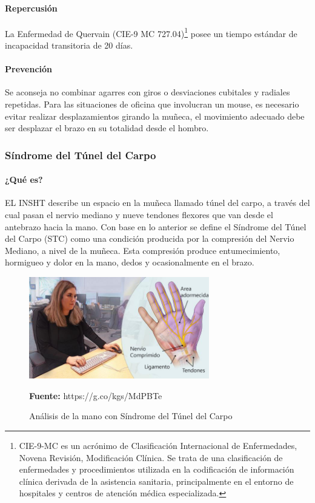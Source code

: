 \paragraph{Repercusión}
La Enfermedad de Quervain (CIE-9 MC 727.04)\footnote{CIE-9-MC es un acrónimo de Clasificación Internacional de Enfermedades, Novena Revisión, Modificación Clínica. Se trata de una clasificación de enfermedades y procedimientos utilizada en la codificación de información clínica derivada de la asistencia sanitaria, principalmente en el entorno de hospitales y centros de atención médica especializada.} posee un tiempo estándar de incapacidad transitoria de 20 días. \parencite[6]{INSHT2017TendinitisPulgar}
\paragraph{Prevención}
Se aconseja no combinar agarres con giros o desviaciones cubitales y radiales repetidas. Para las situaciones de oficina que involucran un mouse, es necesario evitar realizar desplazamientos girando la muñeca, el movimiento adecuado debe ser desplazar el brazo en su totalidad desde el hombro.  \parencite[5]{INSHT2017TendinitisPulgar}
\subsubsection{Síndrome del Túnel del Carpo}
\paragraph{¿Qué es?}
EL INSHT describe un espacio en la muñeca llamado túnel del carpo, a través del cual pasan el nervio mediano y nueve tendones flexores que van desde el antebrazo hacia la mano. \parencite[1]{INSHT2017SindromeCarpiano} Con base en lo anterior se define el Síndrome del Túnel del Carpo (STC) como una condición producida por la compresión del Nervio Mediano, a nivel de la muñeca. Esta compresión produce entumecimiento, hormigueo y dolor en la mano, dedos y ocasionalmente en el brazo. \parencite[1]{INSHT2017SindromeCarpiano}

\begin{figure}[H]
    \centering
    \includegraphics[width=0.7\textwidth]{Anexos/LATEX/chapters/images/STC.jpg}
    \caption{Análisis de la mano con Síndrome del Túnel del Carpo}
    \small{\textbf{Fuente:} https://g.co/kgs/MdPBTe}
    \label{STC}
\end{figure}

